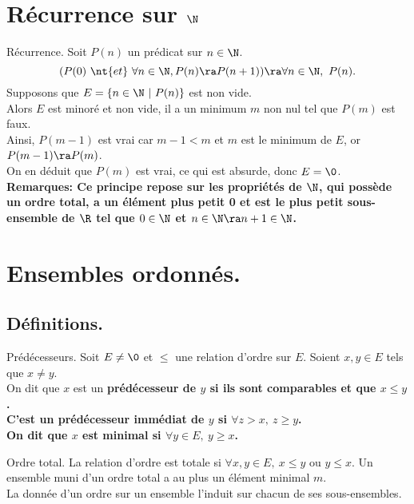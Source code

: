 \documentclass[french, 11pt]{article}
\begin{document}


\section{Récurrence sur \texorpdfstring{$\N$}{Lg}}

\begin{prop}{Récurrence.}{}
    Soit $P(n)$ un prédicat sur $n\in\N$.
    \begin{equation*}
        (P(0) ~ \nt{et} ~ \forall n\in\N, P(n) \ra P(n+1)) \ra \forall n\in\N, ~ P(n).
    \end{equation*}
    \tcblower
    Supposons que $E=\{n\in\N ~ | ~ P(n)\}$ est non vide.\\
    Alors $E$ est minoré et non vide, il a un minimum $m$ non nul tel que $P(m)$ est faux.\\
    Ainsi, $P(m-1)$ est vrai car $m-1<m$ et $m$ est le minimum de $E$, or $P(m-1)\ra P(m)$.\\
    On en déduit que $P(m)$ est vrai, ce qui est absurde, donc $E=\0$.\n
    \bf{Remarques:} Ce principe repose sur les propriétés de $\N$, qui possède un ordre total, a un élément plus petit 0 et est le plus petit sous-ensemble de $\R$ tel que $0\in\N$ et $n\in\N\ra n+1\in\N$.
\end{prop}

\section{Ensembles ordonnés.}
\subsection{Définitions.}

\begin{defi}{Prédécesseurs.}{}
    Soit $E\neq\0$ et $\leq$ une relation d'ordre sur $E$. Soient $x,y\in E$ tels que $x\neq y$.\\
    On dit que $x$ est un \bf{prédécesseur} de $y$ si ils sont comparables et que $x\leq y$.\\
    C'est un \bf{prédécesseur immédiat} de $y$ si $\forall z>x, ~ z\geq y$.\\
    On dit que $x$ est \bf{minimal} si $\forall y \in E, ~ y \geq x$.
\end{defi}

\begin{defi}{Ordre total.}{}
    La relation d'ordre est totale si $\forall x,y\in E, ~ x\leq y$ ou $y \leq x$.\n
    Un ensemble muni d'un ordre total a au plus un élément minimal $m$.\\
    La donnée d'un ordre sur un ensemble l'induit sur chacun de ses sous-ensembles.
\end{defi}
\end{document}
